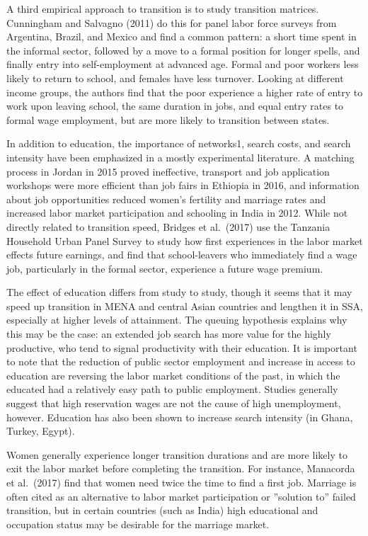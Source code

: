 \documentclass[
  a4paper, twoside, 12pt]{book}
\begin{document}
A third empirical approach to transition is to study transition matrices. Cunningham and Salvagno (2011) do this for panel labor force surveys from Argentina, Brazil, and Mexico and find a common pattern: a short time spent in the informal sector, followed by a move to a formal position for longer spells, and finally entry into self-employment at advanced age. Formal and poor workers less likely to return to school, and females have less turnover. Looking at different income groups, the authors find that the poor experience a higher rate of entry to work upon leaving school, the same duration in jobs, and equal entry rates to formal wage employment, but are more likely to transition between states.

In addition to education, the importance of networks1, search costs, and search intensity have been emphasized in a mostly experimental literature. A matching process in Jordan in 2015 proved ineffective, transport and job application workshops were more efficient than job fairs in Ethiopia in 2016, and information about job opportunities reduced women's fertility and marriage rates and increased labor market participation and schooling in India in 2012. While not directly related to transition speed, Bridges et al.~(2017) use the Tanzania Household Urban Panel Survey to study how first experiences in the labor market effects future earnings, and find that school-leavers who immediately find a wage job, particularly in the formal sector, experience a future wage premium.

The effect of education differs from study to study, though it seems that it may speed up transition in MENA and central Asian countries and lengthen it in SSA, especially at higher levels of attainment. The queuing hypothesis explains why this may be the case: an extended job search has more value for the highly productive, who tend to signal productivity with their education. It is important to note that the reduction of public sector employment and increase in access to education are reversing the labor market conditions of the past, in which the educated had a relatively easy path to public employment. Studies generally suggest that high reservation wages are not the cause of high unemployment, however. Education has also been shown to increase search intensity (in Ghana, Turkey, Egypt).

Women generally experience longer transition durations and are more likely to exit the labor market before completing the transition. For instance, Manacorda et al.~(2017) find that women need twice the time to find a first job. Marriage is often cited as an alternative to labor market participation or ''solution to'' failed transition, but in certain countries (such as India) high educational and occupation status may be desirable for the marriage market.
\end{document}
